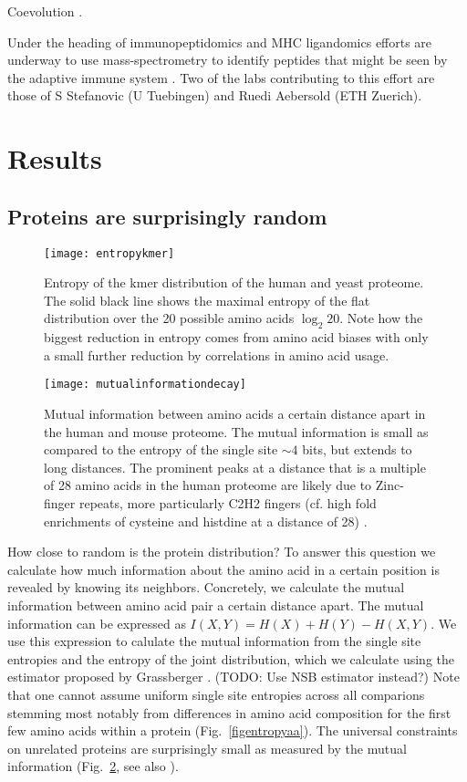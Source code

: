 \documentclass[superscriptaddress,twocolumn,pre]{revtex4}
\newcommand{\<}{\langle}
\renewcommand{\>}{\rangle}
\begin{document}
Coevolution \cite{Bahir2009}.

Under the heading of immunopeptidomics and MHC ligandomics efforts are underway to use mass-spectrometry to identify peptides that might be seen by the adaptive immune system \cite{Abelin2017,Liepe2016}. Two of the labs contributing to this effort are those of S Stefanovic (U Tuebingen) and Ruedi Aebersold (ETH Zuerich).

\section{Results}

\subsection{Proteins are surprisingly random}

\begin{figure}
    \texttt{[image: entropykmer]}
    \caption{Entropy of the kmer distribution of the human and yeast proteome. The solid black line shows the maximal entropy of the flat distribution over the 20 possible amino acids $\log_2 20$. Note how the biggest reduction in entropy comes from amino acid biases with only a small further reduction by correlations in amino acid usage.
    \label{figentropykmer}
    }
\end{figure}


\begin{figure}
    \texttt{[image: mutualinformationdecay]}
    \caption{Mutual information between amino acids a certain distance apart in the human and mouse proteome. The mutual information is small as compared to the entropy of the single site $\sim 4$ bits, but extends to long distances. The prominent peaks at a distance that is a multiple of 28 amino acids in the human proteome are likely due to Zinc-finger repeats, more particularly C2H2 fingers (cf. high fold enrichments of cysteine and histdine at a distance of 28) \cite{Krishna2003}. 
    \label{figmutualinformationdecay}
    }
\end{figure}

How close to random is the protein distribution? To answer this question we calculate how much information about the amino acid in a certain position is revealed by knowing its neighbors. Concretely, we calculate the mutual information between amino acid pair a certain distance apart. The mutual information can be expressed as $I(X, Y) = H(X) + H(Y) - H(X, Y)$. We use this expression to calulate the mutual information from the single site entropies and the entropy of the joint distribution, which we calculate using the estimator proposed by Grassberger \cite{Grassberger2003}. (TODO: Use NSB estimator instead?) Note that one cannot assume uniform single site entropies across all comparions stemming most notably from differences in amino acid composition for the first few amino acids within a protein (Fig.~\ref{figentropyaa}). The universal constraints on unrelated proteins are surprisingly small as measured by the mutual information (Fig.~\ref{figmutualinformationdecay}, see also \cite{Lavelle2009}). 
\end{document}
